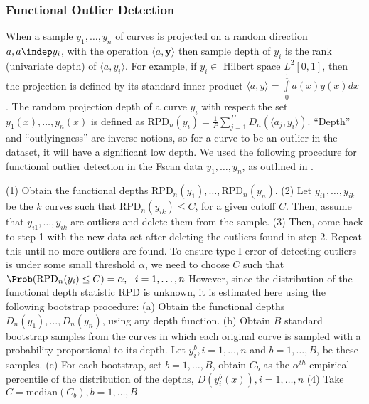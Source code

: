 \subsubsection{Functional Outlier Detection} \label{Sec7_Outliers}
When a sample $y_1, \dots, y_n$ of curves is projected on a random direction $a, a \indep y_i$, with the operation $ \langle a, \mathbf{y} \rangle$ then sample depth of $y_i$ is the rank (univariate depth) of $ \langle a, y_i \rangle$. For example, if $y_i \in \text{ Hilbert space } L^2[0,1]$, then the projection is defined by its standard inner product $\langle a, y \rangle = \int\limits_0^1 a(x) y(x) dx$ \cite{Cuevas_etal_2007_CSDA}. The random projection depth of a curve $y_i$ with respect the set $y_1(x), \dots , y_n(x)$ is defined as $ \text{RPD}_n(y_i) = \frac{1}{P} \sum\limits_{j = 1}^P D_n(\langle a_j, y_i \rangle) $. ``Depth'' and ``outlyingness'' are inverse notions, so for a curve to be an outlier in the dataset, it will have a significant low depth. We used the following procedure for functional outlier detection in the Fscan data $y_1, \dots, y_n$, as outlined in \cite{Febrero-Bande_etal_2007_Environmetrics}. 

(1) Obtain the functional depths $\text{RPD}_n(y_1), \dots, \text{RPD}_n(y_n)$. (2) Let $y_{i1}, \dots, y_{ik}$ be the $k$ curves such that $\text{RPD}_n(y_{ik}) \leq C$, for a given cutoff $C$. Then, assume that $y_{i1}, \dots, y_{ik}$ are outliers and delete them from the sample. (3) Then, come back to step 1 with the new data set after deleting the outliers found in step 2. Repeat this until no more outliers are found. To ensure type-I error of detecting outliers is under some small threshold $\alpha$, we need to choose $C$ such that $\Prob(\text{RPD}_n(y_i) \leq C) = \alpha,\ \ i = 1, \dots, n$
However, since the distribution of the functional depth statistic RPD is unknown, it is estimated here using the following bootstrap procedure: (a) Obtain the functional depths $D_n(y_1), \dots, D_n(y_n)$, using any depth function. (b) Obtain $B$ standard bootstrap samples from the curves in which each original curve is sampled with a probability proportional to its depth. Let $y_i^b, i = 1, \dots, n$ and $b = 1, \dots, B$, be these samples. (c) For each bootstrap, set $b = 1, \dots, B$, obtain $C_b$ as the $\alpha^{th}$ empirical percentile of the distribution of the depths, $D(y_i^b(x)), i = 1, \dots, n$ (4) Take $C = \text{median}(C_b), b = 1, \dots, B$ 

